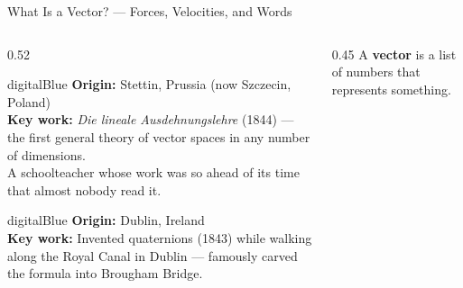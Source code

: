 \begin{frame}[shrink=23]{What Is a Vector? --- Forces, Velocities, and Words}

  \begin{columns}[T]
    \begin{column}{0.52\textwidth}
      \begin{personbox}{digitalBlue}
        \small
        \textbf{Origin:} Stettin, Prussia (now Szczecin, Poland)\\
        \textbf{Key work:} \emph{Die lineale Ausdehnungslehre} (1844) ---
        the first general theory of vector spaces in any number of dimensions.\\
        A schoolteacher whose work was so ahead of its time that almost nobody read it.
      \end{personbox}

      \vspace{0.3em}
      \begin{personbox}{digitalBlue}
        \small
        \textbf{Origin:} Dublin, Ireland\\
        \textbf{Key work:} Invented quaternions (1843) while walking along the Royal Canal
        in Dublin --- famously carved the formula into Brougham Bridge.
      \end{personbox}
    \end{column}

    \begin{column}{0.45\textwidth}
      A \textbf{vector} is a list of numbers that represents something.


\end{column}
\end{columns}
\end{frame}
